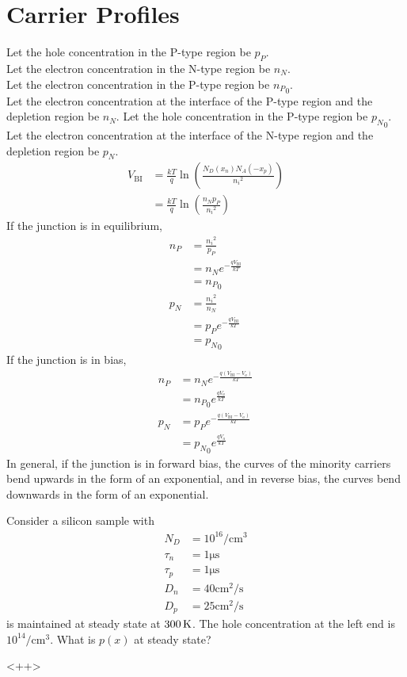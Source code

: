 \documentclass[titlepage, fleqn, a4paper, 12pt, twoside]{article}
\theoremstyle{definition}
\theoremstyle{theorem}
\begin{document}
\section{Carrier Profiles}

Let the hole concentration in the P-type region be $p_P$.\\
Let the electron concentration in the N-type region be $n_N$.\\
Let the electron concentration in the P-type region be ${n_P}_0$.\\
Let the electron concentration at the interface of the P-type region and the depletion region be $n_N$.
Let the hole concentration in the P-type region be ${p_N}_0$.\\
Let the electron concentration at the interface of the N-type region and the depletion region be $p_N$.\\

\begin{align*}
	V_{\text{BI}} &= \frac{k T}{q} \ln\left( \frac{N_D(x_n) N_A(-x_p)}{{n_i}^2} \right)\\
	&= \frac{k T}{q} \ln\left( \frac{n_N p_P}{{n_i}^2} \right)
\end{align*}
If the junction is in equilibrium,
\begin{align*}
	n_P &= \frac{{n_i}^2}{p_P}\\
	&= n_N e^{-\frac{q V_{\text{BI}}}{k T}}\\
	&= {n_P}_0\\
	p_N &= \frac{{n_i}^2}{n_N}\\
	&= p_P e^{-\frac{q V_{\text{BI}}}{k T}}\\
	&= {p_N}_0
\end{align*}
If the junction is in bias,
\begin{align*}
	n_P &= n_N e^{-\frac{q (V_{\text{BI}} - V_a)}{k T}}\\
	&= {n_P}_0 e^{\frac{q V_a}{k T}}\\
	p_N &= p_P e^{-\frac{q (V_{\text{BI}} - V_a)}{k T}}\\
	&= {p_N}_0 e^{\frac{q V_a}{k T}}
\end{align*}
In general, if the junction is in forward bias, the curves of the minority carriers bend upwards in the form of an exponential, and in reverse bias, the curves bend downwards in the form of an exponential.

\begin{question}
	Consider a silicon sample with
	\begin{align*}
		N_D &= 10^{16} \si{\per\centi\metre\cubed}\\
		\tau_n &= 1 \si{\micro\second}\\
		\tau_p &= 1 \si{\micro\second}\\
		D_n &= 40 \si{\centi\metre\squared\per\second}\\
		D_p &= 25 \si{\centi\metre\squared\per\second}
	\end{align*}
	is maintained at steady state at $300 \kelvin$.
	The hole concentration at the left end is $10^{14} \si{\per\centi\metre\cubed}$.
	What is $p(x)$ at steady state?
\end{question}<++>
\end{document}
